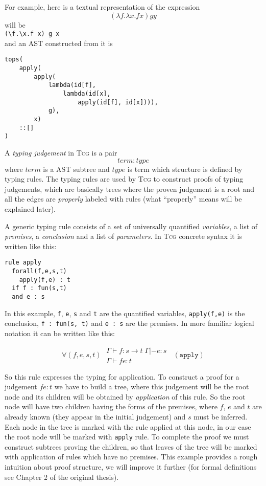 \documentclass[a4paper,12pt]{article}
\newcommand{\Tcg}{\textsc{Tcg}}
\newcommand{\code}[1]{\texttt{#1}}
\newcommand{\premise}[1]{#1\;}
\newcommand{\tcgrule}[5]{
$$
    \forall (#1)\;
    \begin{array}{c}
	    #2\\
	    \hline
            #3
    \end{array}\;(\mathtt{#4})
$$
}
\begin{document}
For example, here is a textual representation of the expression
$$(\lambda f.\lambda x. f x) g y$$
will be\\
\code{(\textbackslash f.\textbackslash x.f x) g x}\\
and an AST constructed from it is
\begin{verbatim}
tops(
    apply(
        apply(
            lambda(id[f], 
                lambda(id[x], 
                    apply(id[f], id[x]))),
            g),
        x)
    ::[]
)
\end{verbatim}

A \emph{typing judgement} in \Tcg{} is a pair 
$$term : type$$
where $term$ is a AST subtree and $type$ is term which structure is defined by typing rules. The typing rules are used by \Tcg{} to construct proofs of typing judgements, which are basically trees where the proven judgement is a root and all the edges are \emph{properly} labeled with rules (what ``properly'' means will be explained later). 

A generic typing rule consists of a set of universally quantified \emph{variables}, a list of \emph{premises}, a \emph{conclusion} and a list of \emph{parameters}. In \Tcg{} concrete syntax it is written like this:
\begin{verbatim}
rule apply
  forall(f,e,s,t)
    apply(f,e) : t
  if f : fun(s,t)
  and e : s
\end{verbatim}

In this example, \code{f}, \code{e}, \code{s} and \code{t} are the quantified variables, \code{apply(f,e)} is the conclusion, \code{f : fun(s, t)} and \code{e : s} are the premises. In more familiar logical notation it can be written like this:
\tcgrule{f, e, s, t}{
    \premise{\Gamma \vdash f : s \rightarrow t}
    \premise{\Gamma |- e : s}
}{\Gamma \vdash f e : t}{apply}{}

So this rule expresses the typing for application. To construct a proof for a judgement $f e : t$ we have to build a tree, where this judgement will be the root node and its children will be obtained by \emph{application} of this rule. So the root node will have two children having the forms of the premises, where $f$, $e$ and $t$ are already known (they appear in the initial judgement) and $s$ must be inferred. Each node in the tree is marked with the rule applied at this node, in our case the root node will be marked with \code{apply} rule. To complete the proof we must construct subtrees proving the children, so that leaves of the tree will be marked with application of rules which have no premises. This example provides a rough intuition about proof structure, we will improve it further (for formal definitions see Chapter 2 of the original thesis).
\end{document}
